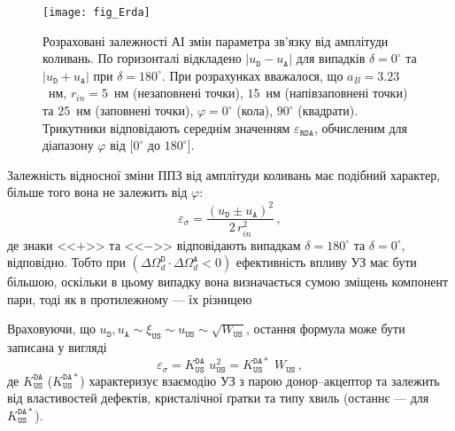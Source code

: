\begin{figure}
\center
\texttt{[image: fig\_Erda]}
\caption{\label{fig_Erda}
Розраховані залежності АІ змін параметра зв'язку від амплітуди коливань.
По горизонталі відкладено $|u_\mathtt{D}-u_\mathtt{A}|$ для випадків $\delta=0^\circ$ та
$|u_\mathtt{D}+u_\mathtt{A}|$ при $\delta=180^\circ$.
При розрахунках вважалося, що
$a_B=3.23$~нм,
$r_{in}=5$~нм (незаповнені точки), $15$~нм (напівзаповнені точки) та $25$~нм (заповнені точки),
$\varphi=0^\circ$ (кола), $90^\circ$ (квадрати).
Трикутники відповідають середнім значенням $\varepsilon_{\mathtt{RDA}}$,
обчисленим для діапазону $\varphi$ від $[0^\circ$ до $180^\circ]$.
}%
\end{figure}

Залежність відносної зміни ППЗ від амплітуди коливань має подібний характер, більше того
вона не залежить від $\varphi$:
\begin{equation}
\label{eqEpsSig}
\varepsilon_{\sigma}=\frac{(u_\mathtt{D}\pm u_\mathtt{A})^2}{2\,r_{in}^2}\,,
\end{equation}
де
знаки <<$+$>> та <<$-$>> відповідають випадкам $\delta=180^\circ$ та $\delta=0^\circ$, відповідно.
Тобто при $(\Delta\Omega_d^\mathtt{D}\cdot\Delta\Omega_d^\mathtt{A}<0)$ ефективність впливу УЗ має бути більшою,
оскільки в цьому випадку вона визначається сумою зміщень компонент пари,
тоді як в протилежному --- їх різницею


Враховуючи, що $u_\mathtt{D},u_\mathtt{A}\sim \xi_\mathtt{US}\sim u_\mathtt{US}\sim \sqrt{W_\mathtt{US}}$,
остання формула може бути записана у вигляді
\begin{equation}
\label{eqEpsSigUS}
\varepsilon_{\sigma}=K_\mathtt{US}^\mathtt{DA}\,\,u_{\mathtt{US}}^2=K_\mathtt{US}^\mathtt{DA*}\,\,W_{\mathtt{US}}\,,
\end{equation}
де $K_\mathtt{US}^\mathtt{DA}$ ($K_\mathtt{US}^\mathtt{DA*}$) характеризує взаємодію УЗ з парою донор--акцептор
та залежить від властивостей дефектів, кристалічної ґратки та типу хвиль (останнє --- для $K_\mathtt{US}^\mathtt{DA*}$).


